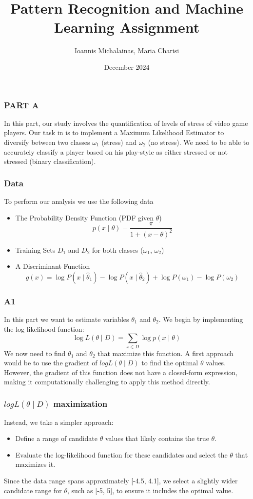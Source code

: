 \documentclass{beamer}
\title{Pattern Recognition and Machine Learning Assignment}
\author{Ioannis Michalainas, Maria Charisi}
\date{December 2024}
\begin{document}
\frame{\titlepage}

\begin{frame}


\frametitle{PART A}
In this part, our study involves the quantification of levels of stress of video game players. Our task in is to implement a Maximum Likelihood Estimator to diversify between two classes $\omega_1$ (stress) and $\omega_2$ (no stress). We need to be able to accurately classify a player based on his play-style as either stressed or not stressed (binary classification).

\end{frame}

\begin{frame}
\frametitle{Data}

To perform our analysis we use the following data 
\begin{itemize}
    \item The Probability Density Function (PDF given $\theta$)$$ p(x \mid \theta) = \frac{\pi}{1 + (x - \theta)^2} $$
    \item Training Sets $D_1$ and $D_2$ for both classes ($\omega_1$, $\omega_2$)
    \item A Discriminant Function $$ g(x) = \log P(x \mid \hat{\theta}_1) - \log P(x \mid \hat{\theta}_2) + \log P(\omega_1) - \log P(\omega_2) $$
\end{itemize}
\end{frame}

\begin{frame}
\frametitle{A1}
In this part we want to estimate variables $\theta_1$ and $\theta_2$.
We begin by implementing the log likelihood function:
$$
\log L(\theta \mid D) = \sum_{x \in D} \log p(x \mid \theta)
$$
We now need to find $\theta_1$ and $\theta_2$ that maximize this function. A first approach would be to use the gradient of $log L(\theta \mid D)$ to find the optimal $\theta$ values. However, the gradient of this function does not have a closed-form expression, making it computationally challenging to apply this method directly.
\end{frame}

\begin{frame}
\frametitle{$log L(\theta \mid D)$ maximization}
Instead, we take a simpler approach:
\begin{itemize}
    \item Define a range of candidate $\theta$ values that likely contains the true $\theta$.
    \item Evaluate the log-likelihood function for these candidates and select the $\theta$ that maximizes it.
\end{itemize}
Since the data range spans approximately [-4.5, 4.1], we select a slightly wider candidate range for $\theta$, such as [-5, 5], to ensure it includes the optimal value.
\end{frame}
\end{document}
